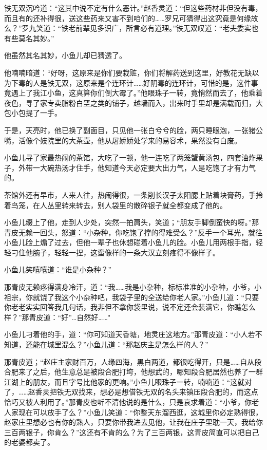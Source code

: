 \documentclass[12pt,oneside]{book}
\begin{document}
铁无双沉吟道：``这其中说不定有什么恶计。''赵香灵道：``但这些药材非但没有毒，而且有的还补得很，送这些药来又害不到咱们的\ldots\ldots 罗兄可猜得出这究竟是何缘故么？''罗九笑道：``铁老前辈见多识广，所言必有道理。''铁无双叹道：``老夫委实也有些莫名其妙。''

他虽然其名其妙，小鱼儿却已猜透了。

他喃喃暗道：``好呀，这原来是你们要栽赃，你们将解药送到这里，好教花无缺以为下毒的人是铁无双，这原来是个连环计\ldots\ldots 好阴毒的连环计，可惜的是，这件事竟遇上了我江小鱼，这真算你们倒大霉了。''他眼珠子一转，竟悄然而去了，他乘着夜色，寻了家专卖脂粉白垩之类的铺子，越墙而入，出来时手里却是满载而归，大包小包提了一手。

于是，天亮时，他已换了副面目，只见他一张白兮兮的脸，两只睡眼泡，一张猪公嘴，活像个妓院里的大茶壶，他从屠娇娇处学来的易容术，果然没有白废。

小鱼儿寻了家最热闹的茶馆，大吃了一顿，他一连吃了两笼蟹黄汤包，四套油炸果子，外带一大碗热汤才住手，他知道今天必定要大出力气，人是吃饱了才有力气的。

茶馆外还有早市，人来人往，热闹得很，一条削长汉子太阳腮上贴着块膏药，手拎着鸟笼，在人丛里转来转去，别人袋里的散碎银子就全都变成了他的。

小鱼儿缀上了他，走到人少处，突然一拍肩头，笑道；``朋友手脚倒蛮快的呀。''那青皮无赖一回头，怒道：``小杂种，你吃饱了撑的得难受么？''反手一个耳光，就往小鱼儿脸上煽了过去，但他一辈子也休想碰着小鱼儿的脸。小鱼儿用两根手指，轻轻刁住他腕子，轻轻一捏，这蛮像样的一条大汉立刻疼得不像样子。

小鱼儿笑嘻嘻道：``谁是小杂种？''

那青皮无赖疼得满身冷汗，道：``我\ldots\ldots 我是小杂种，标标准准的小杂种，小爷，小祖宗，你就饶了我这个小杂种吧，我袋子里的全送给你老人家。''小鱼儿道：``只要你老老实实回答我几句话，我非但不拿你袋里说，说不定还会装满它，你瞧怎么样？''那青皮道：``好''\ldots 自然好\ldots\ldots"

小鱼儿刁着他的手，道：``你可知道天香塘，地灵庄这地方。''那青皮道：``小人若不知道，还能在城里混么？''小鱼儿道：``那赵庆主是怎么样的人？''

那青皮道；``赵庄主家财百万，人缘四海，黑白两道，都很吃得开，只是\ldots\ldots 自从段合肥来了之后，他生意总是被段合肥打垮，他想武的，哪知段合肥居然也养了一群江湖上的朋友，而且字号比他家的更响。''小鱼儿眼珠子一转，喃喃道：``这就对了，\ldots\ldots 赵香灵把铁无双找来，想必是想借铁无双的名头来镇压段合肥的，而这点恰巧又被人利用了。''那青皮也听不清他说的是什么，只是哀求着道：``小爷，你老人家现在可以放手了么？''小鱼儿笑道：``你整天东溜西逛，这城里你必定熟得很，赵家庄里想必也有你的熟人，只要你带我进去见他，让我在庄子里耽一天，我给你三百两银子，你肯么？''这还有不肯的么？为了三百两银，这青皮简直可以把自己的老婆都卖了。
\end{document}
